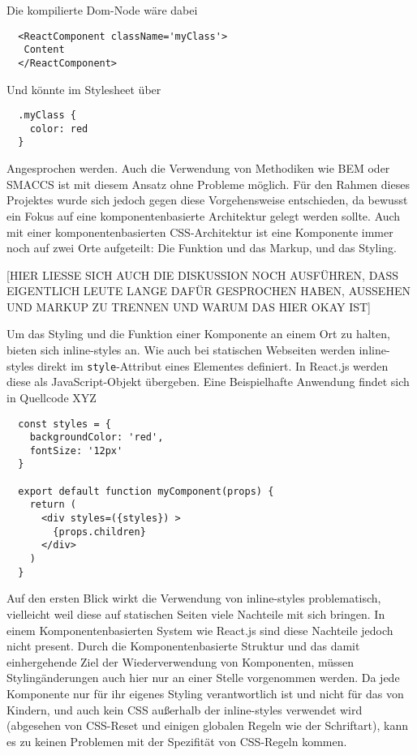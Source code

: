 Die kompilierte Dom-Node wäre dabei

\begin{lstlisting}
  <ReactComponent className='myClass'>
   Content
  </ReactComponent>
\end{lstlisting}

Und könnte im Stylesheet über

\begin{lstlisting}
  .myClass {
    color: red
  }
\end{lstlisting}

Angesprochen werden. Auch die Verwendung von Methodiken wie BEM oder SMACCS ist mit diesem Ansatz ohne Probleme möglich.
Für den Rahmen dieses Projektes wurde sich jedoch gegen diese Vorgehensweise entschieden, da bewusst ein Fokus auf eine komponentenbasierte Architektur gelegt werden sollte. Auch mit einer komponentenbasierten CSS-Architektur ist eine Komponente immer noch auf zwei Orte aufgeteilt: Die Funktion und das Markup, und das Styling.

[HIER LIESSE SICH AUCH DIE DISKUSSION NOCH AUSFÜHREN, DASS EIGENTLICH LEUTE LANGE DAFÜR GESPROCHEN HABEN, AUSSEHEN UND MARKUP ZU TRENNEN UND WARUM DAS HIER OKAY IST]

Um das Styling und die Funktion einer Komponente an einem Ort zu halten, bieten sich inline-styles an. Wie auch bei statischen Webseiten werden inline-styles direkt im \verb|style|-Attribut eines Elementes definiert. In React.js werden diese als JavaScript-Objekt übergeben. Eine Beispielhafte Anwendung findet sich in Quellcode XYZ

\begin{lstlisting}
  const styles = {
    backgroundColor: 'red',
    fontSize: '12px'
  }

  export default function myComponent(props) {
    return (
      <div styles=({styles}) >
  		{props.children}
  	  </div>
    )
  }
\end{lstlisting}

Auf den ersten Blick wirkt die Verwendung von inline-styles problematisch, vielleicht weil diese auf statischen Seiten viele Nachteile mit sich bringen. In einem Komponentenbasierten System wie React.js sind diese Nachteile jedoch nicht present. Durch die Komponentenbasierte Struktur und das damit einhergehende Ziel der Wiederverwendung von Komponenten, müssen Stylingänderungen auch hier nur an einer Stelle vorgenommen werden. Da jede Komponente nur für ihr eigenes Styling verantwortlich ist und nicht für das von Kindern, und auch kein CSS außerhalb der inline-styles verwendet wird (abgesehen von CSS-Reset und einigen globalen Regeln wie der Schriftart), kann es zu keinen Problemen mit der Spezifität von CSS-Regeln kommen.

